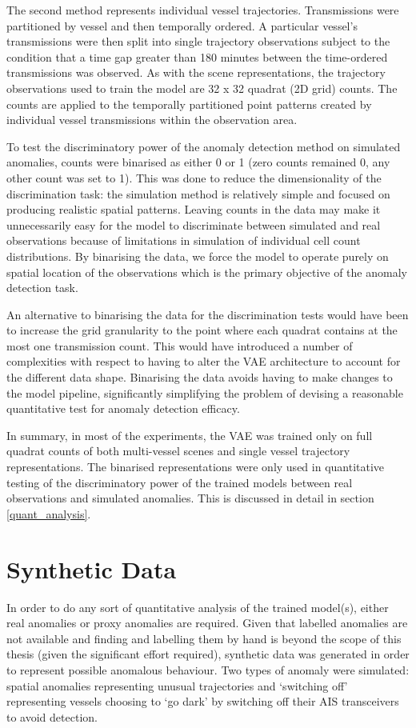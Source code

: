 \documentclass{mldsmsc}
\begin{document}
The second method represents individual vessel trajectories. Transmissions were partitioned by vessel and then temporally ordered. A particular vessel's transmissions were then split into single trajectory observations subject to the condition that a time gap greater than 180 minutes between the time-ordered transmissions was observed. As with the scene representations, the  trajectory observations used to train the model are 32 x 32 quadrat (2D grid) counts. The counts are applied to the temporally partitioned point patterns created by individual vessel transmissions within the observation area.

To test the discriminatory power of the anomaly detection method on simulated anomalies, counts were binarised as either 0 or 1 (zero counts remained 0, any other count was set to 1).  This was done to reduce the dimensionality of the discrimination task: the simulation method is relatively simple and focused on producing realistic spatial patterns. Leaving counts in the data may make it unnecessarily easy for the model to discriminate between simulated and real observations because of limitations in simulation of individual cell count distributions. By binarising the data, we force the model to operate purely on spatial location of the observations which is the primary objective of the anomaly detection task.

An alternative to binarising the data for the discrimination tests would have been to increase the grid granularity to the point where each quadrat contains at the most one transmission count. This would have introduced a number of complexities with respect to having to alter the VAE architecture to account for the different data shape. Binarising the data avoids having to make changes to the model pipeline, significantly simplifying the problem of devising a reasonable quantitative test for anomaly detection efficacy.

In summary, in most of the experiments, the VAE was trained only on full quadrat counts of both multi-vessel scenes and single vessel trajectory representations. The binarised representations were only used in quantitative testing of the discriminatory power of the trained models between real observations and simulated anomalies. This is discussed in detail in section \ref{quant_analysis}.



\section{Synthetic Data}
In order to do any sort of quantitative analysis of the trained model(s), either real anomalies or proxy anomalies are required. Given that labelled anomalies are not available and finding and labelling them by hand is beyond the scope of this thesis (given the significant effort required), synthetic data was generated in order to represent possible anomalous behaviour. Two types of anomaly were simulated: spatial anomalies representing unusual trajectories and `switching off' representing vessels choosing to `go dark' by switching off their AIS transceivers to avoid detection. 
\end{document}
